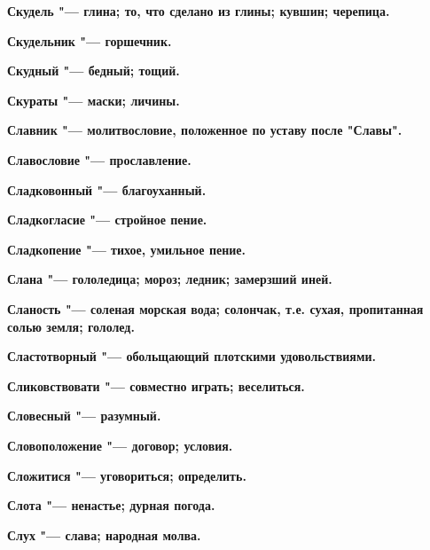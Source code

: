 \bfseries Скудель \normalfont{} "--- глина; то, что сделано из глины; кувшин; черепица. 




\bfseries Скудельник \normalfont{} "--- горшечник. 




\bfseries Скудный \normalfont{} "--- бедный; тощий. 




\bfseries Скураты \normalfont{} "--- маски; личины. 




\bfseries Славник \normalfont{} "--- молитвословие, положенное по уставу после "Славы". 




\bfseries Славословие \normalfont{} "--- прославление. 




\bfseries Сладковонный \normalfont{} "--- благоуханный. 




\bfseries Сладкогласие \normalfont{} "--- стройное пение. 




\bfseries Сладкопение \normalfont{} "--- тихое, умильное пение. 




\bfseries Слана \normalfont{} "--- гололедица; мороз; ледник; замерзший иней. 




\bfseries Сланость \normalfont{} "--- соленая морская вода; солончак, т.е. сухая, пропитанная солью земля; гололед. 




\bfseries Сластотворный \normalfont{} "--- обольщающий плотскими удовольствиями. 




\bfseries Сликовствовати \normalfont{} "--- совместно играть; веселиться. 




\bfseries Словесный \normalfont{} "--- разумный. 




\bfseries Словоположение \normalfont{} "--- договор; условия. 




\bfseries Сложитися \normalfont{} "--- уговориться; определить. 




\bfseries Слота \normalfont{} "--- ненастье; дурная погода. 




\bfseries Слух \normalfont{} "--- слава; народная молва. 




